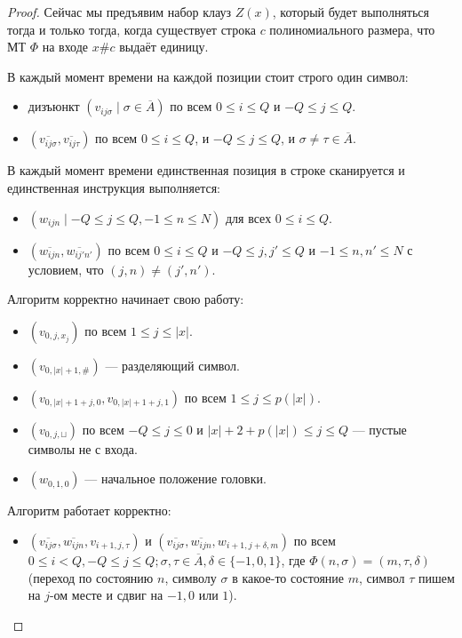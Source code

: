 \documentclass[a4paper, 12pt]{article}
\begin{document}
\begin{proof}
  Сейчас мы предъявим набор клауз $Z(x)$, который будет выполняться тогда и
  только тогда, когда существует строка $c$ полиномиального размера, что 
  МТ $\Phi$ на входе $x\#c$ выдаёт единицу.

  В каждый момент времени на каждой позиции стоит строго один символ:

  \begin{itemize}
    \item дизъюнкт $(v_{ij\sigma} \mid \sigma \in \overline{A})$ по всем 
    $0 \leqslant i \leqslant Q$ и $-Q \leqslant j \leqslant Q$.
    \item $(\overline{v_{ij\sigma}}, \overline{v_{ij\tau}})$ по всем 
    $0 \leqslant i \leqslant Q$, и $-Q \leqslant j \leqslant Q$, и $\sigma \neq
    \tau \in \overline{A}$.
  \end{itemize}

  В каждый момент времени единственная позиция в строке сканируется и
  единственная инструкция выполняется:

  \begin{itemize}
    \item $(w_{ijn} \mid -Q \leqslant j \leqslant Q, -1 \leqslant n \leqslant N)$
    для всех $0 \leqslant i \leqslant Q$.
    \item $(\overline{w_{ijn}}, \overline{w_{ij'n'}})$ по всем 
    $0 \leqslant i \leqslant Q$ и $-Q \leqslant j, j' \leqslant Q$ и 
    $-1\leqslant n, n' \leqslant N$ с условием, что $(j, n) \neq (j', n')$.
  \end{itemize}

  Алгоритм корректно начинает свою работу:

  \begin{itemize}
    \item $(v_{0, j, x_j})$ по всем $1 \leqslant j \leqslant |x|$.
    \item $(v_{0, |x| + 1, \#})$ --- разделяющий символ.
    \item $(v_{0, |x |+ 1 + j, 0}, v_{0, |x| + 1 + j, 1})$
    по всем $1 \leqslant j \leqslant p(|x|)$.
    \item $(v_{0, j, \sqcup})$ по всем $-Q \leqslant j \leqslant 0$ и
    $|x| + 2 + p(|x|) \leqslant j \leqslant Q$ --- пустые символы не с входа.
    \item $(w_{0,1,0})$ --- начальное положение головки.
  \end{itemize}

  Алгоритм работает корректно:

  \begin{itemize}
    \item $(\overline{v_{ij\sigma}}, \overline{w_{ijn}}, v_{i + 1, j, \tau})$ и
    $(\overline{v_{ij\sigma}}, \overline{w_{ijn}}, w_{i + 1, j + \delta, m})$
    по всем $0 \leqslant i < Q, -Q \leqslant j\leqslant Q; \sigma, \tau \in 
    \overline{A}, \delta \in \{-1, 0, 1\}$, где $\Phi(n, \sigma) = 
    (m, \tau, \delta)$ (переход по состоянию $n$, символу $\sigma$ в какое-то
    состояние $m$, символ $\tau$ пишем на $j$-ом месте и сдвиг на $-1, 0$ или $1$).
  \end{itemize}


\end{proof}
\end{document}
